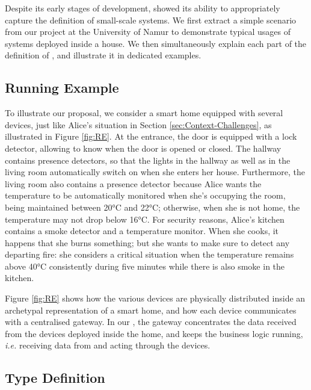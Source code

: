 Despite its early stages of development, \IOTDSL showed its ability to appropriately capture the definition of small-scale \IOT systems. We first extract a simple scenario from our project at the University of Namur to demonstrate typical usages of \IOT systems deployed inside a house. We then simultaneously explain each part of the definition of \IOTDSL, and illustrate it in dedicated examples.


\vspace{-0.3cm}
\subsection{Running Example}
\label{sec:IoTDSL-Example}
\vspace{-0.3cm}

To illustrate our proposal, we consider a smart home equipped with several devices, just like Alice's situation in Section \ref{sec:Context-Challenges}, as illustrated in Figure \ref{fig:RE}. At the entrance, the door is equipped with a lock detector, allowing to know when the door is opened or closed. The hallway contains presence detectors, so that the lights in the hallway as well as in the living room automatically switch on when she enters her house. Furthermore, the living room also contains a presence detector because Alice wants the temperature to be automatically monitored when she's occupying the room, being maintained between 20°C and 22°C; otherwise, when she is not home, the temperature may not drop below 16°C. For security reasons, Alice's kitchen contains a smoke detector and a temperature monitor. When she cooks, it happens that she burns something; but she wants to make sure to detect any departing fire: she considers a critical situation when the temperature remains above 40°C consistently during five minutes while there is also smoke in the kitchen. 


Figure \ref{fig:RE} shows how the various devices are physically distributed inside an archetypal representation of a smart home, and how each device communicates with a centralised gateway. In our \DSL, the gateway concentrates the data received from the devices deployed inside the home, and keeps the business logic running, \textit{i.e.} receiving data from and acting through the devices. 


\vspace{-0.3cm}
\subsection{Type Definition}
\label{sec:IoTDSL-Type}
\vspace{-0.3cm}



